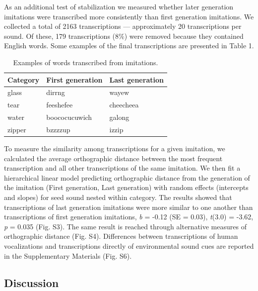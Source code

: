 \documentclass[english,floatsintext,man]{apa6}
\theoremstyle{definition}
\theoremstyle{definition}
\theoremstyle{definition}
\theoremstyle{remark}
\begin{document}
As an additional test of stabilization we measured whether later
generation imitations were transcribed more consistently than first
generation imitations. We collected a total of 2163 transcriptions ---
approximately 20 transcriptions per sound. Of these, 179 transcriptions
(8\%) were removed because they contained English words. Some examples
of the final transcriptions are presented in Table 1.

\begin{table}

\caption{\label{tab:table1}Examples of words transcribed from imitations.}
\centering
\begin{tabular}[t]{l|l|l}
\hline
Category & First generation & Last generation\\
\hline
glass & dirrng & wayew\\
\hline
tear & feeshefee & cheecheea\\
\hline
water & boococucuwich & galong\\
\hline
zipper & bzzzzup & izzip\\
\hline
\end{tabular}
\end{table}

To measure the similarity among transcriptions for a given imitation, we
calculated the average orthographic distance between the most frequent
transcription and all other transcriptions of the same imitation. We
then fit a hierarchical linear model predicting orthographic distance
from the generation of the imitation (First generation, Last generation)
with random effects (intercepts and slopes) for seed sound nested within
category. The results showed that transcriptions of last generation
imitations were more similar to one another than transcriptions of first
generation imitations, \emph{b} = -0.12 (SE = 0.03), \emph{t}(3.0) =
-3.62, \emph{p} = 0.035 (Fig. S3). The same result is reached through
alternative measures of orthographic distance (Fig. S4). Differences
between transcriptions of human vocalizations and transcriptions
directly of environmental sound cues are reported in the Supplementary
Materials (Fig. S6).

\hypertarget{discussion}{%
\subsection{Discussion}\label{discussion}}
\end{document}
